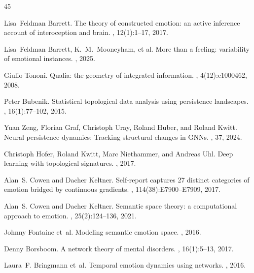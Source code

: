 \documentclass{article}
\begin{document}

\begin{thebibliography}{45}

Lisa~Feldman Barrett.
\newblock The theory of constructed emotion: an active inference account of
  interoception and brain.
, 12(1):1--17,
  2017.

Lisa~Feldman Barrett, K.~M.~Mooneyham, et al.
\newblock More than a feeling: variability of emotional instances.
, 2025.

Giulio Tononi.
\newblock Qualia: the geometry of integrated information.
, 4(12):e1000462, 2008.

Peter Bubenik.
\newblock Statistical topological data analysis using persistence
  landscapes.
, 16(1):77--102, 2015.

Yuan Zeng, Florian Graf, Christoph Uray, Roland Huber, and Roland Kwitt.
\newblock Neural persistence dynamics: Tracking structural changes in
  GNNs.
, 37,
  2024.

Christoph Hofer, Roland Kwitt, Marc Niethammer, and Andreas Uhl.
\newblock Deep learning with topological signatures.
, 2017.

Alan~S. Cowen and Dacher Keltner.
\newblock Self-report captures 27 distinct categories of emotion bridged by
  continuous gradients.
, 114(38):E7900--E7909, 2017.

Alan~S. Cowen and Dacher Keltner.
\newblock Semantic space theory: a computational approach to emotion.
, 25(2):124--136, 2021.

Johnny Fontaine et~al.
\newblock Modeling semantic emotion space.
, 2016.

Denny Borsboom.
\newblock A network theory of mental disorders.
, 16(1):5--13, 2017.

Laura~F. Bringmann et~al.
\newblock Temporal emotion dynamics using networks.
, 2016.


\end{thebibliography}
\end{document}
